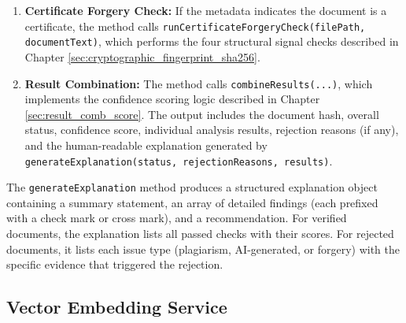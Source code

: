 \begin{enumerate}
    \item \textbf{Certificate Forgery Check:} If the metadata indicates the document is a certificate, the method calls \texttt{runCertificateForgeryCheck(filePath, documentText)}, which performs the four structural signal checks described in Chapter \ref{sec:cryptographic_fingerprint_sha256}.
    \item \textbf{Result Combination:} The method calls \texttt{combineResults(...)}, which implements the confidence scoring logic described in Chapter \ref{sec:result_comb_score}. The output includes the document hash, overall status, confidence score, individual analysis results, rejection reasons (if any), and the human-readable explanation generated by \texttt{generateExplanation(status, rejectionReasons, results)}.
\end{enumerate}

The \texttt{generateExplanation} method produces a structured explanation object containing a summary statement, an array of detailed findings (each prefixed with a check mark or cross mark), and a recommendation. For verified documents, the explanation lists all passed checks with their scores. For rejected documents, it lists each issue type (plagiarism, AI-generated, or forgery) with the specific evidence that triggered the rejection.

\subsection{Vector Embedding Service}

